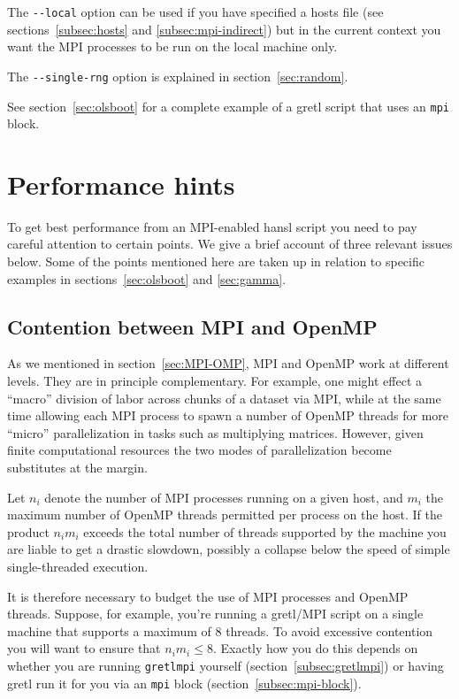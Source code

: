 \documentclass{article}
\begin{document}
The \verb|--local| option can be used if you have specified a hosts
file (see sections~\ref{subsec:hosts} and \ref{subsec:mpi-indirect})
but in the current context you want the MPI processes to be run on the
local machine only.

The \verb|--single-rng| option is explained in
section~\ref{sec:random}.

\vspace{1ex}

See section~\ref{sec:olsboot} for a complete example of a gretl script
that uses an \texttt{mpi} block.

\section{Performance hints}
\label{sec:performance}

To get best performance from an MPI-enabled hansl script you need to
pay careful attention to certain points. We give a brief account of
three relevant issues below. Some of the points mentioned here are
taken up in relation to specific examples in
sections~\ref{sec:olsboot} and \ref{sec:gamma}.

\subsection{Contention between MPI and OpenMP}
\label{sec:contention}

As we mentioned in section~\ref{sec:MPI-OMP}, MPI and \textsf{OpenMP}
work at different levels. They are in principle complementary. For
example, one might effect a ``macro'' division of labor across chunks
of a dataset via MPI, while at the same time allowing each MPI process
to spawn a number of \textsf{OpenMP} threads for more ``micro''
parallelization in tasks such as multiplying matrices.
However, given finite computational resources the two modes of
parallelization become substitutes at the margin. 

Let $n_i$ denote the number of MPI processes running on a given host,
and $m_i$ the maximum number of \textsf{OpenMP} threads permitted per
process on the host. If the product $n_im_i$ exceeds the total number
of threads supported by the machine you are liable to get a drastic
slowdown, possibly a collapse below the speed of simple
single-threaded execution.

It is therefore necessary to budget the use of MPI processes and
\textsf{OpenMP} threads. Suppose, for example, you're running a
gretl/MPI script on a single machine that supports a maximum of 8
threads. To avoid excessive contention you will want to ensure that
$n_im_i \leq 8$. Exactly how you do this depends on whether you are
running \texttt{gretlmpi} yourself
(section~\ref{subsec:gretlmpi}) or having gretl run it for you via
an \texttt{mpi} block (section~\ref{subsec:mpi-block}).
\end{document}

